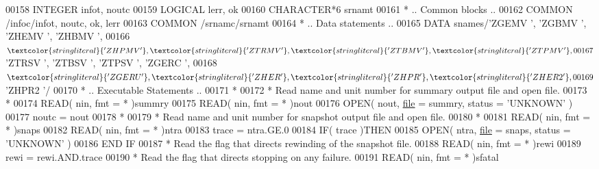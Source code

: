 \begin{DoxyCode}
00158       \textcolor{keywordtype}{INTEGER}            infot, noutc
00159       \textcolor{keywordtype}{LOGICAL}            lerr, ok
00160       \textcolor{keywordtype}{CHARACTER*6}        srnamt
00161 \textcolor{comment}{*     .. Common blocks ..}
00162       \textcolor{keyword}{COMMON}             /infoc/infot, noutc, ok, lerr
00163       \textcolor{keyword}{COMMON}             /srnamc/srnamt
00164 \textcolor{comment}{*     .. Data statements ..}
00165       \textcolor{keyword}{DATA}               snames/\textcolor{stringliteral}{'ZGEMV '}, \textcolor{stringliteral}{'ZGBMV '}, \textcolor{stringliteral}{'ZHEMV '}, \textcolor{stringliteral}{'ZHBMV '},
00166      $                   \textcolor{stringliteral}{'ZHPMV '}, \textcolor{stringliteral}{'ZTRMV '}, \textcolor{stringliteral}{'ZTBMV '}, \textcolor{stringliteral}{'ZTPMV '},
00167      $                   \textcolor{stringliteral}{'ZTRSV '}, \textcolor{stringliteral}{'ZTBSV '}, \textcolor{stringliteral}{'ZTPSV '}, \textcolor{stringliteral}{'ZGERC '},
00168      $                   \textcolor{stringliteral}{'ZGERU '}, \textcolor{stringliteral}{'ZHER  '}, \textcolor{stringliteral}{'ZHPR  '}, \textcolor{stringliteral}{'ZHER2 '},
00169      $                   \textcolor{stringliteral}{'ZHPR2 '}/
00170 \textcolor{comment}{*     .. Executable Statements ..}
00171 \textcolor{comment}{*}
00172 \textcolor{comment}{*     Read name and unit number for summary output file and open file.}
00173 \textcolor{comment}{*}
00174       \textcolor{keyword}{READ}( nin, fmt = * )summry
00175       \textcolor{keyword}{READ}( nin, fmt = * )nout
00176       \textcolor{keyword}{OPEN}( nout, \hyperlink{structfile}{file} = summry, status = \textcolor{stringliteral}{'UNKNOWN'} )
00177       noutc = nout
00178 \textcolor{comment}{*}
00179 \textcolor{comment}{*     Read name and unit number for snapshot output file and open file.}
00180 \textcolor{comment}{*}
00181       \textcolor{keyword}{READ}( nin, fmt = * )snaps
00182       \textcolor{keyword}{READ}( nin, fmt = * )ntra
00183       trace = ntra.GE.0
00184       \textcolor{keywordflow}{IF}( trace )\textcolor{keywordflow}{THEN}
00185          \textcolor{keyword}{OPEN}( ntra, \hyperlink{structfile}{file} = snaps, status = \textcolor{stringliteral}{'UNKNOWN'} )
00186 \textcolor{keywordflow}{      END IF}
00187 \textcolor{comment}{*     Read the flag that directs rewinding of the snapshot file.}
00188       \textcolor{keyword}{READ}( nin, fmt = * )rewi
00189       rewi = rewi.AND.trace
00190 \textcolor{comment}{*     Read the flag that directs stopping on any failure.}
00191       \textcolor{keyword}{READ}( nin, fmt = * )sfatal

\end{DoxyCode}

